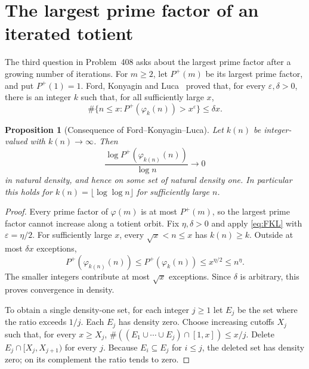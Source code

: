 \documentclass[10pt]{article}
\newtheorem{prop}[thm]{Proposition}
\begin{document}
\section{The largest prime factor of an iterated totient}\label{sec:smoothness}

The third question in Problem~408 asks about the largest prime factor after a growing number of iterations. For $m\geq2$, let $P^+(m)$ be its largest prime factor, and put $P^+(1)=1$. Ford, Konyagin and Luca~\cite[Theorem~5]{FKL} proved that, for every $\varepsilon,\delta>0$, there is an integer $k$ such that, for all sufficiently large $x$,
\begin{equation}\label{eq:FKL}
 \#\{n\leq x:P^+(\varphi_k(n))>x^\varepsilon\}\leq\delta x.
\end{equation}

\begin{prop}[Consequence of Ford--Konyagin--Luca]
Let $k(n)$ be integer-valued with $k(n)\to\infty$. Then
\[
 \frac{\log P^+(\varphi_{k(n)}(n))}{\log n}\longrightarrow0
\]
in natural density, and hence on some set of natural density one. In particular this holds for $k(n)=\lfloor\log\log n\rfloor$ for sufficiently large $n$.
\end{prop}
\begin{proof}
Every prime factor of $\varphi(m)$ is at most $P^+(m)$, so the largest prime factor cannot increase along a totient orbit. Fix $\eta,\delta>0$ and apply \eqref{eq:FKL} with $\varepsilon=\eta/2$. For sufficiently large $x$, every $\sqrt{x}<n\leq x$ has $k(n)\geq k$. Outside at most $\delta x$ exceptions,
\[
 P^+(\varphi_{k(n)}(n))\leq P^+(\varphi_k(n))
          \leq x^{\eta/2}\leq n^\eta.
\]
The smaller integers contribute at most $\sqrt{x}$ exceptions. Since $\delta$ is arbitrary, this proves convergence in density.

To obtain a single density-one set, for each integer $j\geq1$ let $E_j$ be the set where the ratio exceeds $1/j$. Each $E_j$ has density zero. Choose increasing cutoffs $X_j$ such that, for every $x\geq X_j$, $\#((E_1\cup\cdots\cup E_j)\cap[1,x])\leq x/j$. Delete $E_j\cap[X_j,X_{j+1})$ for every $j$. Because $E_i\subseteq E_j$ for $i\leq j$, the deleted set has density zero; on its complement the ratio tends to zero.
\end{proof}
\end{document}
